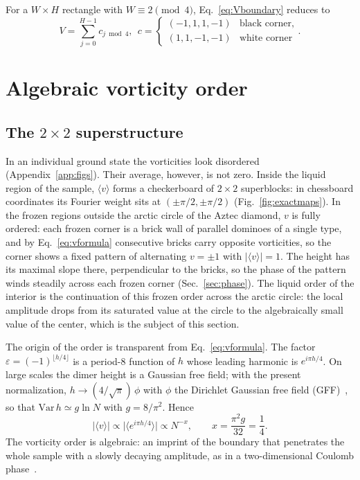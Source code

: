 \documentclass[aps,prb,twocolumn,floatfix,longbibliography]{revtex4-2}
\newcommand{\eps}{\varepsilon}
\newcommand{\floor}[1]{\lfloor #1\rfloor}
\begin{document}
For a $W\times H$ rectangle with $W\equiv2\pmod4$, Eq.~\eqref{eq:Vboundary} reduces to
\begin{equation}
V=\sum_{j=0}^{H-1}c_{j\bmod4},\ \ c=\begin{cases}(-1,1,1,-1) & \text{black corner},\\ (1,1,-1,-1)& \text{white corner}\end{cases}.
\label{eq:rect}
\end{equation}

\section{Algebraic vorticity order}
\label{sec:order}

\subsection{The \texorpdfstring{$2\times2$}{2x2} superstructure}

In an individual ground state the vorticities look disordered (Appendix~\ref{app:figs}). Their average, however, is not zero. Inside the liquid region of the sample, $\langle v\rangle$ forms a checkerboard of $2\times2$ superblocks: in chessboard coordinates its Fourier weight sits at $(\pm\pi/2,\pm\pi/2)$ (Fig.~\ref{fig:exactmaps}). In the frozen regions outside the arctic circle of the Aztec diamond, $v$ is fully ordered: each frozen corner is a brick wall of parallel dominoes of a single type, and by Eq.~\eqref{eq:vformula} consecutive bricks carry opposite vorticities, so the corner shows a fixed pattern of alternating $v=\pm1$ with $|\langle v\rangle|=1$. The height has its maximal slope there, perpendicular to the bricks, so the phase of the pattern winds steadily across each frozen corner (Sec.~\ref{sec:phase}). The liquid order of the interior is the continuation of this frozen order across the arctic circle: the local amplitude drops from its saturated value at the circle to the algebraically small value of the center, which is the subject of this section.

The origin of the order is transparent from Eq.~\eqref{eq:vformula}. The factor $\eps=(-1)^{\floor{h/4}}$ is a period-8 function of $h$ whose leading harmonic is $e^{i\pi h/4}$. On large scales the dimer height is a Gaussian free field; with the present normalization, $h\to(4/\sqrt\pi)\,\phi$ with $\phi$ the Dirichlet Gaussian free field (GFF)~\cite{Kenyon2001,KenyonLectures}, so that $\mathrm{Var}\,h\simeq g\ln N$ with $g=8/\pi^2$. Hence
\begin{equation}
|\langle v\rangle|\propto\bigl|\langle e^{i\pi h/4}\rangle\bigr|\propto N^{-x},\qquad x=\frac{\pi^2 g}{32}=\frac14 .
\label{eq:exponent}
\end{equation}
The vorticity order is algebraic: an imprint of the boundary that penetrates the whole sample with a slowly decaying amplitude, as in a two-dimensional Coulomb phase~\cite{Henley2010,Nienhuis1987}.
\end{document}
